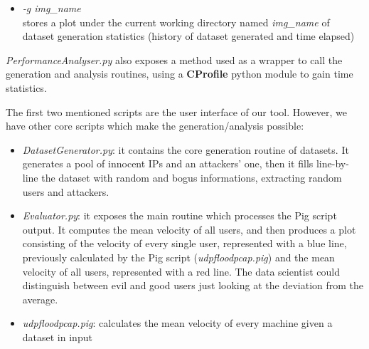 \begin{itemize}
\begin{itemize}
				\item \textit{-g img\_name} \\ stores a plot under the current working directory named \textit{img\_name} of dataset generation statistics (history of dataset generated and time elapsed)
			\end{itemize}
			\textit{PerformanceAnalyser.py} also exposes a method used as a wrapper to call the generation and analysis routines, using a \textbf{CProfile} python module to gain time statistics.
\end{itemize}

The first two mentioned scripts are the user interface of our tool. However, we have other core scripts which make the generation/analysis possible:

\begin{itemize}
	\item{\textit{DatasetGenerator.py}}: it contains the core generation routine of datasets. It generates a pool of innocent IPs and an attackers' one, then it fills line-by-line the dataset with random and bogus informations, extracting random users and attackers.
	\item{\textit{Evaluator.py}}: it exposes the main routine which processes the Pig script output. It computes the mean velocity of all users, and then produces a plot consisting of the velocity of every single user, represented with a blue line, previously calculated by the Pig script (\textit{udpfloodpcap.pig}) and the mean velocity of all users, represented with a red line. The data scientist could distinguish between evil and good users just looking at the deviation from the average.
	\item{\textit{udpfloodpcap.pig}}: calculates the mean velocity of every machine given a dataset in input
\end{itemize}





